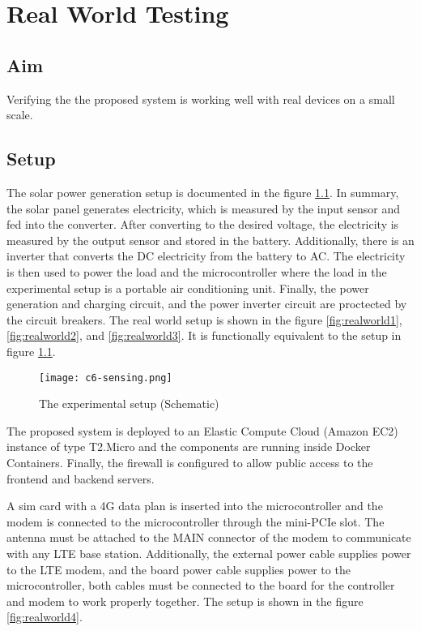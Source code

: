 \documentclass[../thesis.tex]{subfiles}
\begin{document}
\chapter{Real World Testing}
\label{chap:rw}

\section{Aim}

Verifying the the proposed system is working well with real devices on a small scale.

\section{Setup} %

The solar power generation setup is documented in the figure \ref{fig:realworldsensing}. In summary, the solar panel generates electricity, which is measured by the input sensor and fed into the converter. After converting to the desired voltage, the electricity is measured by the output sensor and stored in the battery. Additionally, there is an inverter that converts the DC electricity from the battery to AC. The electricity is then used to power the load and the microcontroller where the load in the experimental setup is a portable air conditioning unit. Finally, the power generation and charging circuit, and the power inverter circuit are proctected by the circuit breakers. The real world setup is shown in the figure \ref{fig:realworld1}, \ref{fig:realworld2}, and \ref{fig:realworld3}. It is functionally equivalent to the setup in figure \ref{fig:realworldsensing}.

\begin{figure}[!ht]
	\centering
	\texttt{[image: c6-sensing.png]}
	\caption{The experimental setup (Schematic)}
	\label{fig:realworldsensing}
\end{figure}

The proposed system is deployed to an Elastic Compute Cloud (Amazon EC2) instance of type T2.Micro and the components are running inside Docker Containers. Finally, the firewall is configured to allow public access to the frontend and backend servers. 

A sim card with a 4G data plan is inserted into the microcontroller and the modem is connected to the microcontroller through the mini-PCIe slot. The antenna must be attached to the MAIN connector of the modem to communicate with any LTE base station. Additionally, the external power cable supplies power to the LTE modem, and the board power cable supplies power to the microcontroller, both cables must be connected to the board for the controller and modem to work properly together. The setup is shown in the figure \ref{fig:realworld4}. 
\end{document}

